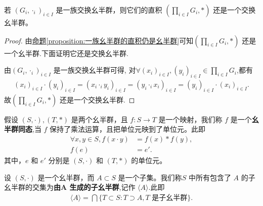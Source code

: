 \documentclass[../../main.tex]{subfiles}
\begin{document}
\begin{proposition}[一族交换幺半群的直积仍是交换幺半群]\label{proposition:一族交换幺半群的直积仍是交换幺半群}
若 $(G_i,\cdot_i)_{i\in I}$ 是一族交换幺半群，则它们的直积 $(\prod_{i\in I}G_i,*)$ 还是一个交换幺半群。  
\end{proposition}
\begin{proof}
由\hyperref[proposition:一族幺半群的直积仍是幺半群]{命题\ref{proposition:一族幺半群的直积仍是幺半群}}可知$(\prod_{i\in I}G_i,*)$ 还是一个幺半群.下面证明它还是交换幺半群.

由$(G_i,\cdot_i)_{i\in I}$ 是一族交换幺半群可得,
对$\forall (x_i)_{i\in I},(y_i)_{i\in I} \in \prod_{i\in I}G_i$,都有
\begin{align*}
\left( x_i \right) _{i\in I}\cdot \left( y_i \right) _{i\in I}=\left( x_i\cdot _iy_i \right) _{i\in I}=\left( y_i\cdot _ix_i \right) _{i\in I}=\left( y_i \right) _{i\in I}\cdot \left( x_i \right) _{i\in I}.
\end{align*}
故$(\prod_{i\in I}G_i,*)$ 还是一个交换幺半群.
\end{proof}

\begin{definition}[幺半群同态]
假设 $(S, \cdot), (T, *)$ 是两个幺半群，且 $f : S \to T$ 是一个映射，我们称 $f$ 是一个\textbf{幺半群同态},当 $f$ 保持了乘法运算，且把单位元映到了单位元。此即
\begin{align*}
\forall x, y \in S, f(x \cdot y) &= f(x) * f(y) ,\\
f(e) &= e'.
\end{align*}
其中，$e$ 和 $e'$ 分别是 $(S, \cdot)$ 和 $(T, *)$ 的单位元。 
\end{definition}

\begin{definition}[由子集生成的子幺半群]
设 $(S, \cdot)$ 是一个幺半群，而 $A \subset S$ 是一个子集。我们称$S$ 中所有包含了 $A$ 的子幺半群的交集为\textbf{由$\boldsymbol{A}$ 生成的子幺半群},记作 $\langle A \rangle$.此即
\begin{align*}
\langle A \rangle = \bigcap \{T \subset S : T \supset A, T \text{ 是子幺半群}\}.
\end{align*} 
\end{definition}
\end{document}
